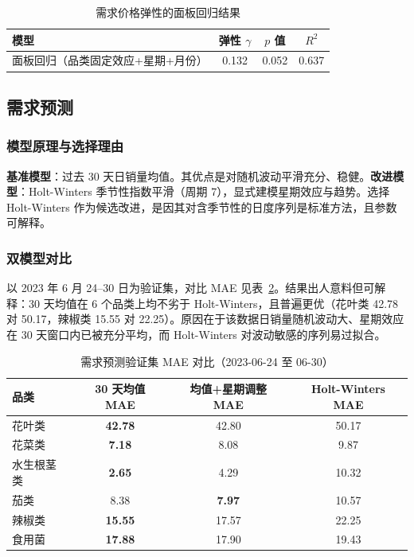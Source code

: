 \documentclass[12pt]{ctexart}
\begin{document}
\begin{table}[htbp]
\centering
\caption{需求价格弹性的面板回归结果}
\label{tab:elast}
\begin{tabular}{lccc}
\toprule
模型 & 弹性 $\gamma$ & $p$ 值 & $R^2$ \\
\midrule
面板回归（品类固定效应+星期+月份） & 0.132 & 0.052 & 0.637 \\
\bottomrule
\end{tabular}
\end{table}

\subsection{需求预测}

\subsubsection{模型原理与选择理由}
\textbf{基准模型}：过去 30 天日销量均值。其优点是对随机波动平滑充分、稳健。\textbf{改进模型}：Holt-Winters 季节性指数平滑（周期 7），显式建模星期效应与趋势。选择 Holt-Winters 作为候选改进，是因其对含季节性的日度序列是标准方法，且参数可解释。

\subsubsection{双模型对比}
以 2023 年 6 月 24--30 日为验证集，对比 MAE 见表~\ref{tab:forecast}。结果出人意料但可解释：30 天均值在 6 个品类上均不劣于 Holt-Winters，且普遍更优（花叶类 42.78 对 50.17，辣椒类 15.55 对 22.25）。原因在于该数据日销量随机波动大、星期效应在 30 天窗口内已被充分平均，而 Holt-Winters 对波动敏感的序列易过拟合。

\begin{table}[htbp]
\centering
\caption{需求预测验证集 MAE 对比（2023-06-24 至 06-30）}
\label{tab:forecast}
\begin{tabular}{lccc}
\toprule
品类 & 30 天均值 MAE & 均值+星期调整 MAE & Holt-Winters MAE \\
\midrule
花叶类 & \textbf{42.78} & 42.80 & 50.17 \\
花菜类 & \textbf{7.18} & 8.08 & 9.87 \\
水生根茎类 & \textbf{2.65} & 4.29 & 10.32 \\
茄类 & 8.38 & \textbf{7.97} & 10.57 \\
辣椒类 & \textbf{15.55} & 17.57 & 22.25 \\
食用菌 & \textbf{17.88} & 17.90 & 19.43 \\
\bottomrule
\end{tabular}
\end{table}
\end{document}

